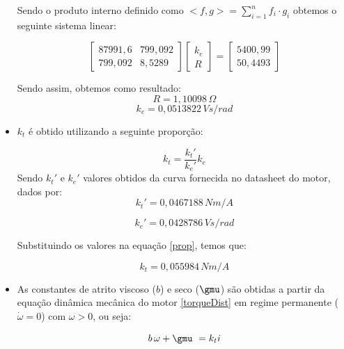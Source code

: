 \documentclass[]{politex}
\begin{document}
\begin{itemize}
Sendo o produto interno definido como $ <f,g> = \displaystyle\sum_{i=1}^n f_i \cdot g_i $ obtemos o seguinte sistema linear:

\begin{equation}
\begin{bmatrix}
87991{,}6 & 799{,}092\\
799{,}092 & 8{,}5289
\end{bmatrix}
\begin{bmatrix}
k_{e}\\
R
\end{bmatrix}= 
\begin{bmatrix}
5400{,}99\\
50{,}4493
\end{bmatrix}
\end{equation}

Sendo assim, obtemos como resultado:
\begin{equation}
R = 1{,}10098 \, \Omega 
\end{equation}
\begin{equation}
k_e = 0{,}0513822 \, V s/rad
\end{equation}

\item $k_{t}$ é obtido utilizando a seguinte proporção:

\begin{equation}
\label{prop}
k_{t} = \frac{k_{t}'}{k_{e}'} k_{e}
\end{equation}
Sendo $k_{t}'$ e $k_{e}'$ valores obtidos da curva fornecida no datasheet do motor, dados por:
\begin{equation}
k_{t}' = 0{,}0467188 \, N m/A
\end{equation}

\begin{equation}
k_{e}' = 0{,}0428786 \, V s/rad
\end{equation}

Substituindo os valores na equação \eqref{prop}, temos que:

\begin{equation}
k_t = 0{,}055984 \, N m/A
\end{equation}

\item As constantes de atrito viscoso ($b$) e seco ($\gmu$) são obtidas a partir da equação dinâmica mecânica do motor \eqref{torqueDist} em regime permanente ($\dot{\omega}=0$) com $\omega > 0$, ou seja: 

\begin{equation}
\label{dimMec}
b \, \omega+\gmu \ = k_{t} i
\end{equation}


\end{itemize}
\end{document}
